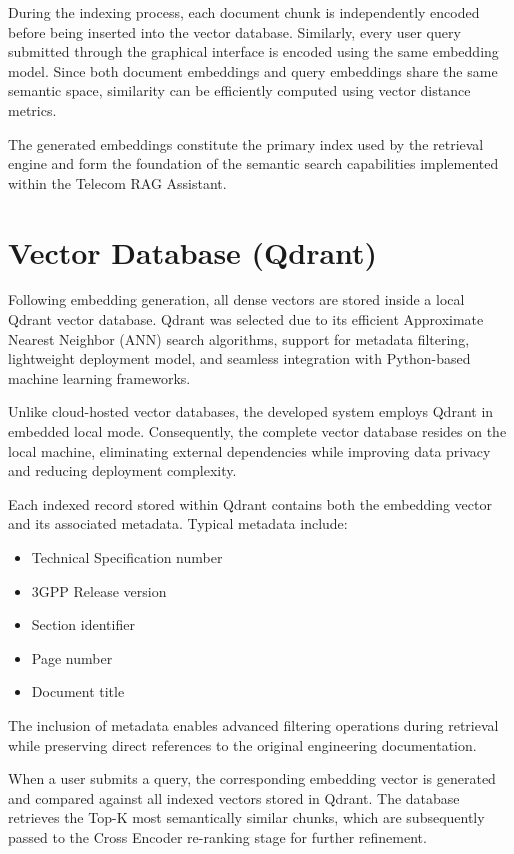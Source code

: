 During the indexing process, each document chunk is independently encoded before being inserted into the vector database. Similarly, every user query submitted through the graphical interface is encoded using the same embedding model. Since both document embeddings and query embeddings share the same semantic space, similarity can be efficiently computed using vector distance metrics.

The generated embeddings constitute the primary index used by the retrieval engine and form the foundation of the semantic search capabilities implemented within the Telecom RAG Assistant.

\section{Vector Database (Qdrant)}

Following embedding generation, all dense vectors are stored inside a local Qdrant vector database. Qdrant was selected due to its efficient Approximate Nearest Neighbor (ANN) search algorithms, support for metadata filtering, lightweight deployment model, and seamless integration with Python-based machine learning frameworks.

Unlike cloud-hosted vector databases, the developed system employs Qdrant in embedded local mode. Consequently, the complete vector database resides on the local machine, eliminating external dependencies while improving data privacy and reducing deployment complexity.

Each indexed record stored within Qdrant contains both the embedding vector and its associated metadata. Typical metadata include:

\begin{itemize}
    \item Technical Specification number
    \item 3GPP Release version
    \item Section identifier
    \item Page number
    \item Document title
\end{itemize}

The inclusion of metadata enables advanced filtering operations during retrieval while preserving direct references to the original engineering documentation.

When a user submits a query, the corresponding embedding vector is generated and compared against all indexed vectors stored in Qdrant. The database retrieves the Top-K most semantically similar chunks, which are subsequently passed to the Cross Encoder re-ranking stage for further refinement.
